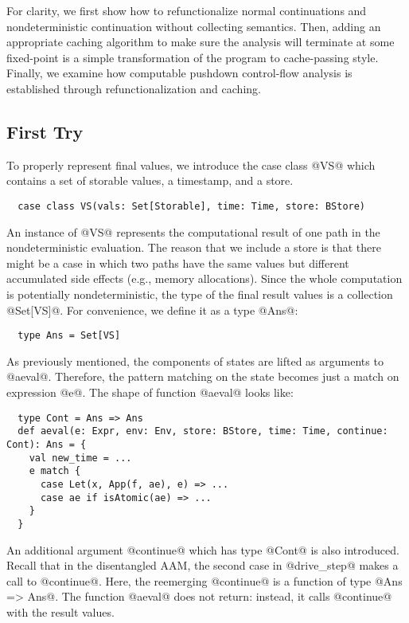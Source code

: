 \documentclass[acmsmall, review]{acmart}\settopmatter{}
\begin{document}
For clarity, we first show how to refunctionalize normal continuations and
nondeterministic continuation without collecting semantics.
Then, adding an appropriate caching algorithm to make sure the analysis will
terminate at some fixed-point is a simple transformation of the program to cache-passing
style. Finally, we examine how computable pushdown control-flow analysis is established
through refunctionalization and caching.

\subsection{First Try}

To properly represent final values, we introduce the case class @VS@ which
contains a set of storable values, a timestamp, and a store.

\begin{lstlisting}
  case class VS(vals: Set[Storable], time: Time, store: BStore)
\end{lstlisting}

An instance of @VS@ represents the computational result of one path in
the nondeterministic evaluation.
The reason that we include a store is that there might be a case in which two paths
have the same values but different accumulated side effects (e.g., memory allocations).
Since the whole computation is potentially nondeterministic, the type of the final result
values is a collection @Set[VS]@. For convenience, we define it as a type @Ans@:

\begin{lstlisting}
  type Ans = Set[VS]
\end{lstlisting}

As previously mentioned, the components of states are lifted as arguments to
@aeval@. Therefore, the pattern matching on the state becomes just a match on
expression @e@. The shape of function @aeval@ looks like:

\begin{lstlisting}
  type Cont = Ans => Ans
  def aeval(e: Expr, env: Env, store: BStore, time: Time, continue: Cont): Ans = {
    val new_time = ...
    e match {
      case Let(x, App(f, ae), e) => ...
      case ae if isAtomic(ae) => ...
    }
  }
\end{lstlisting}

An additional argument @continue@ which has type @Cont@ is also introduced.
Recall that in the disentangled AAM, the second case in @drive_step@
makes a call to @continue@. Here, the reemerging @continue@ is a function
of type @Ans => Ans@. The function @aeval@ does not return: instead, it calls
@continue@ with the result values. \\
\end{document}
